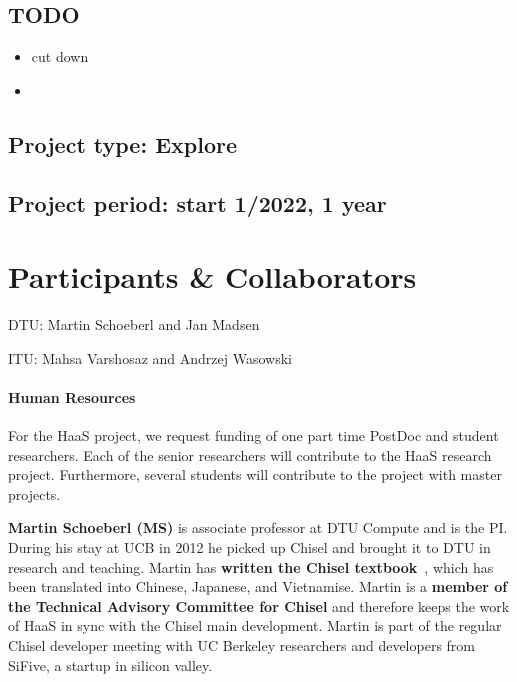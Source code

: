 \documentclass[fleqn,12pt]{article}
\begin{document}
\subsection*{TODO}

\begin{itemize}
\item cut down
\item
\end{itemize}

\subsection*{Project type: Explore}

\subsection*{Project period: start 1/2022, 1 year}

\section*{Participants \& Collaborators}

\noindent DTU: Martin Schoeberl and Jan Madsen

\noindent ITU: Mahsa Varshosaz and Andrzej Wasowski

\paragraph*{Human Resources}

For the HaaS project, we request funding of one part time PostDoc and student researchers.
Each of the senior researchers will contribute to the HaaS research project.
Furthermore, several students will contribute to the project with
master projects.
%
%


{\bf Martin Schoeberl (MS)} is associate professor at DTU Compute and is the PI.
During his stay
at UCB in 2012 he picked up Chisel and brought it to DTU in research and teaching.
Martin has {\bf written the Chisel textbook}~\cite{chisel:book}, which has been translated
into Chinese, Japanese, and Vietnamise. Martin is a {\bf member of the Technical Advisory Committee for
Chisel} and therefore keeps the work of HaaS in sync with the Chisel main development.
Martin is part of the regular Chisel developer meeting with
UC Berkeley researchers and developers from SiFive, a startup in silicon valley.
\end{document}
